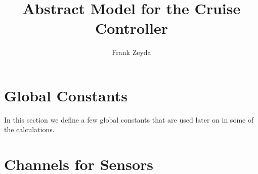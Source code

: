 \documentclass{article}
\title{Abstract {\Circus} Model for the Cruise Controller}
\author{Frank Zeyda}
\begin{document}
\maketitle

\tableofcontents

\newpage






%
%



\section{Global Constants}

In this section we define a few global constants that are used later on in some of the calculations.
%


\newpage


\section{Channels for Sensors}
\end{document}
